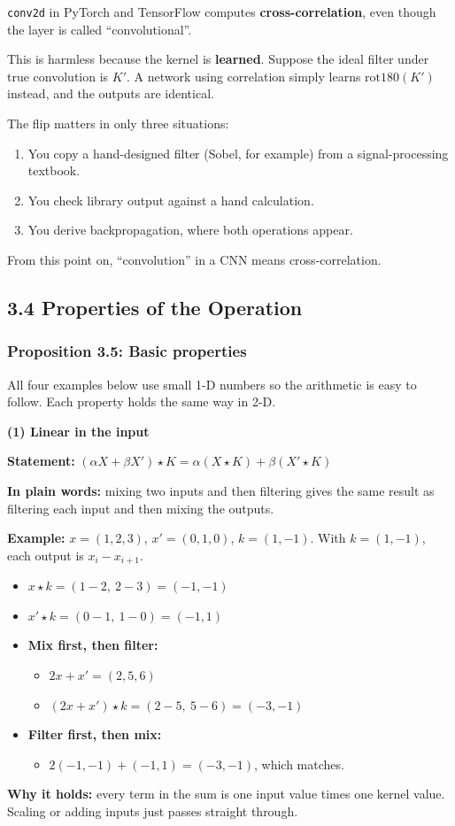 \texttt{conv2d} in PyTorch and TensorFlow computes \textbf{cross-correlation}, even though the layer is called ``convolutional''.

This is harmless because the kernel is \textbf{learned}. Suppose the ideal filter under true convolution is $K'$. A network using correlation simply learns $\mathrm{rot180}(K')$ instead, and the outputs are identical.

The flip matters in only three situations:
\begin{enumerate}
  \item You copy a hand-designed filter (Sobel, for example) from a signal-processing textbook.
  \item You check library output against a hand calculation.
  \item You derive backpropagation, where both operations appear.
\end{enumerate}
From this point on, ``convolution'' in a CNN means cross-correlation.


\subsection*{3.4 Properties of the Operation}

\subsubsection*{Proposition 3.5: Basic properties}
All four examples below use small 1-D numbers so the arithmetic is easy to follow. Each property holds the same way in 2-D.

\textbf{(1) Linear in the input}

\textbf{Statement:} $(\alpha X + \beta X') \star K = \alpha (X \star K) + \beta (X' \star K)$

\textbf{In plain words:} mixing two inputs and then filtering gives the same result as filtering each input and then mixing the outputs.

\textbf{Example:} $x = (1, 2, 3)$, $x' = (0, 1, 0)$, $k = (1, -1)$. With $k = (1, -1)$, each output is $x_i - x_{i+1}$.
\begin{itemize}
  \item $x \star k = (1-2,\ 2-3) = (-1, -1)$
  \item $x' \star k = (0-1,\ 1-0) = (-1, 1)$
  \item \textbf{Mix first, then filter:}
  \begin{itemize}
    \item $2x + x' = (2, 5, 6)$
    \item $(2x + x') \star k = (2-5,\ 5-6) = (-3, -1)$
  \end{itemize}
  \item \textbf{Filter first, then mix:}
  \begin{itemize}
    \item $2(-1, -1) + (-1, 1) = (-3, -1)$, which matches.
  \end{itemize}
\end{itemize}
\textbf{Why it holds:} every term in the sum is one input value times one kernel value. Scaling or adding inputs just passes straight through.

